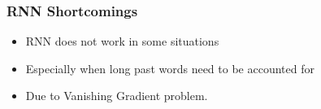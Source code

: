


\begin{frame}[fragile] \frametitle{RNN Shortcomings}
\begin{itemize}
\item RNN does not work in some situations
\item Especially when long past words need to be accounted for
\item Due to Vanishing Gradient problem.
\end{itemize}
\end{frame}
